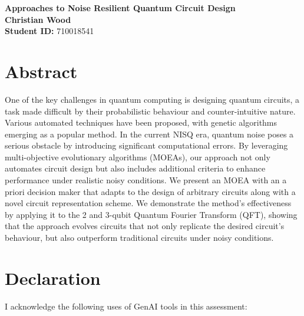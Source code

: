 \documentclass[11pt,a4paper]{article}
\begin{document}
\singlespacing %
\thispagestyle{empty} %

\begin{center}
{\bf \LARGE Approaches to Noise Resilient Quantum Circuit Design}\\[0.5cm]
  \textbf{Christian Wood} \\[0.2cm]
  \textbf{Student ID:} 710018541 \\[1cm]
\end{center}

\section*{Abstract}
\noindent 
One of the key challenges in quantum computing is designing quantum circuits, a task made difficult by their probabilistic behaviour and counter-intuitive nature. Various automated techniques have been proposed, with genetic algorithms emerging as a popular method. In the current NISQ era, quantum noise poses a serious obstacle by introducing significant computational errors. By leveraging multi-objective evolutionary algorithms (MOEAs), our approach not only automates circuit design but also includes additional criteria to enhance performance under realistic noisy conditions. We present an MOEA with an a priori decision maker that adapts to the design of arbitrary circuits along with a novel circuit representation scheme. We demonstrate the method’s effectiveness by applying it to the 2 and 3-qubit Quantum Fourier Transform (QFT), showing that the approach evolves circuits that not only replicate the desired circuit's behaviour, but also outperform traditional circuits under noisy conditions.

\newpage
\thispagestyle{empty} 
\section*{Declaration}
I acknowledge the following uses of GenAI tools in this assessment: 
\end{document}
